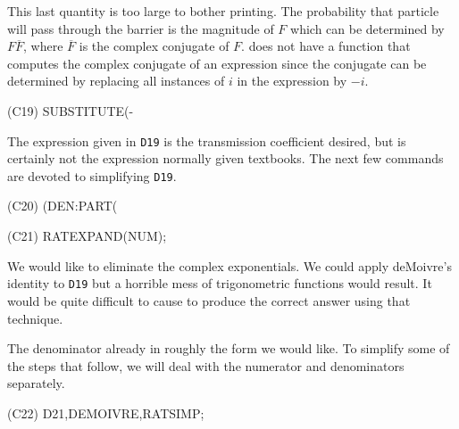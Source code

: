 This last quantity is too large to bother printing.  The probability
that particle will pass through the barrier is the magnitude of $F$
which can be determined by $F $, where $$ is the
complex conjugate of $F$.  {\Macsyma} does not have a  function that
computes the complex conjugate of an expression since the conjugate can
be determined by replacing all instances of $i$ in the expression by 
$-i$.  
\begin{code}
(C19) SUBSTITUTE(-%
\end{code}

The expression given in {\tt D19} is the transmission coefficient desired,
but is certainly not the expression normally given textbooks.  The next few
commands are devoted to simplifying {\tt D19}.  
\begin{code}
(C20) (DEN:PART(%

(C21) RATEXPAND(NUM);
\end{code}
We would like to eliminate the complex exponentials.  We could apply
deMoivre's identity to {\tt D19} but a horrible mess of trigonometric
functions would result.  It would be quite difficult to cause {\Macsyma} to
produce the correct answer using that technique.  

The denominator already in roughly the form we would like.  To simplify some
of the steps that follow, we will deal with the numerator and denominators
separately. 
\begin{code}
(C22) D21,DEMOIVRE,RATSIMP;
\end{code}

